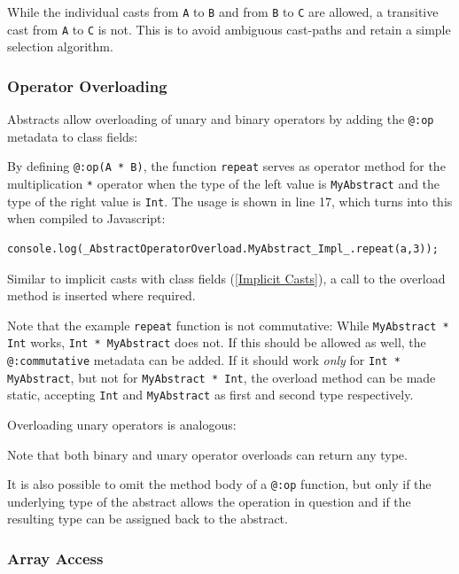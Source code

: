 \documentclass{article}
\newcommand{\target}[1]{#1}
\newcommand{\type}[1]{\texttt{#1}}
\newcommand{\expr}[1]{\texttt{#1}}
\newcommand{\tref}[2]{#1 (\ref{#2})}
\begin{document}

While the individual casts from \type{A} to \type{B} and from \type{B} to \type{C} are allowed, a transitive cast from \type{A} to \type{C} is not. This is to avoid ambiguous cast-paths and retain a simple selection algorithm. 




\subsubsection{Operator Overloading}

Abstracts allow overloading of unary and binary operators by adding the \expr{@:op} metadata to class fields:


By defining \expr{@:op(A * B)}, the function \expr{repeat} serves as operator method for the multiplication \expr{*} operator when the type of the left value is \type{MyAbstract} and the type of the right value is \type{Int}. The usage is shown in line 17, which turns into this when compiled to \target{Javascript}:

\begin{lstlisting}
console.log(_AbstractOperatorOverload.MyAbstract_Impl_.repeat(a,3));
\end{lstlisting}
Similar to \tref{implicit casts with class fields}{Implicit Casts}, a call to the overload method is inserted where required.

Note that the example \expr{repeat} function is not commutative: While \expr{MyAbstract * Int} works, \expr{Int * MyAbstract} does not. If this should be allowed as well, the \expr{@:commutative} metadata can be added. If it should work \emph{only} for \expr{Int * MyAbstract}, but not for \expr{MyAbstract * Int}, the overload method can be made static, accepting \type{Int} and \type{MyAbstract} as first and second type respectively.

Overloading unary operators is analogous:


Note that both binary and unary operator overloads can return any type.

It is also possible to omit the method body of a \expr{@:op} function, but only if the underlying type of the abstract allows the operation in question and if the resulting type can be assigned back to the abstract.


\subsubsection{Array Access}
\end{document}
